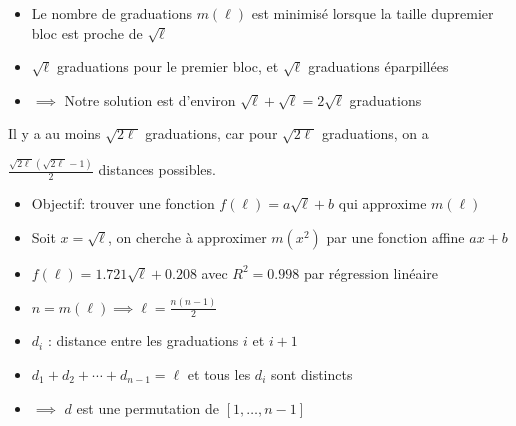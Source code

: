 \documentclass[12pt]{article}
\begin{document}

\begin{itemize}
    \renewcommand{\labelitemi}{\textbullet}
	\setlength\itemsep{1em}
    \item Le nombre de graduations $m(\ell)$ est minimisé lorsque la taille du\newline premier bloc est proche de $\sqrt{\ell}$
    \item $\sqrt{\ell}$ graduations pour le premier bloc, et $\sqrt{\ell}$ graduations éparpillées
    \item[] $\implies$ Notre solution est d'environ $\sqrt{\ell} + \sqrt{\ell} = 2\sqrt{\ell}$ graduations
\end{itemize}

\vspace{1cm}


Il y a au moins $\sqrt{2\ell}$ graduations, car pour $\sqrt{2\ell}$ graduations, on a

$\frac{\sqrt{2\ell}(\sqrt{2\ell}-1)}{2}$ distances possibles.

\vspace{1cm}


\begin{itemize}
    \renewcommand{\labelitemi}{\textbullet}
	\setlength\itemsep{1em}
    \item Objectif: trouver une fonction $f(\ell)=a\sqrt{\ell}+b$ qui approxime $m(\ell)$
    \item Soit $x=\sqrt{\ell}$, on cherche à approximer $m(x^2)$ par une fonction affine $ax+b$
    \item $f(\ell) = 1.721\sqrt{\ell}+0.208$ avec $R^2=0.998$ par régression linéaire
\end{itemize}

\vspace{1cm}


\begin{itemize}
    \renewcommand{\labelitemi}{\textbullet}
	\setlength\itemsep{1em}
    \item $n = m(\ell) \implies \ell = \frac{n(n-1)}{2}$
    \item $d_i$ : distance entre les graduations $i$ et $i+1$
    \item $d_1 + d_2 + \cdots + d_{n-1} = \ell$ et tous les $d_i$ sont distincts
    \item[] $\implies$ $d$ est une permutation de $[1,\dots,n-1]$
\end{itemize}
\end{document}
